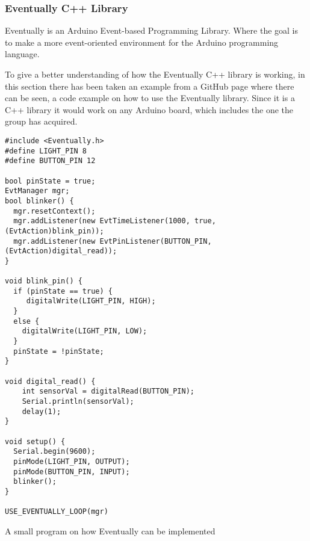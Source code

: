 \cleardoublepage




\subsubsection{Eventually C++ Library}
Eventually is an Arduino Event-based Programming Library. Where the goal is to make a more event-oriented environment for the Arduino programming language.

To give a better understanding of how the Eventually C++ library is working, in this section there has been taken an example from a GitHub page \cite{bartlettEventually2022Bartlett} where there can be seen, a code example on how to use the Eventually library. Since it is a C++ library it would work on any Arduino board, which includes the one the group has acquired.


\begin{listing}
\begin{verbatim}
#include <Eventually.h>
#define LIGHT_PIN 8
#define BUTTON_PIN 12

bool pinState = true;
EvtManager mgr;
bool blinker() {
  mgr.resetContext();
  mgr.addListener(new EvtTimeListener(1000, true, (EvtAction)blink_pin)); 
  mgr.addListener(new EvtPinListener(BUTTON_PIN, (EvtAction)digital_read));
}

void blink_pin() {
  if (pinState == true) {
     digitalWrite(LIGHT_PIN, HIGH);
  }
  else {
    digitalWrite(LIGHT_PIN, LOW);
  }
  pinState = !pinState;
}

void digital_read() {
    int sensorVal = digitalRead(BUTTON_PIN);
    Serial.println(sensorVal);
    delay(1);
}

void setup() {
  Serial.begin(9600);
  pinMode(LIGHT_PIN, OUTPUT);
  pinMode(BUTTON_PIN, INPUT);
  blinker();
}

USE_EVENTUALLY_LOOP(mgr)
\end{verbatim}
\caption{A small program on how Eventually can be implemented}
\label{List: Eventually example}
\end{listing}



